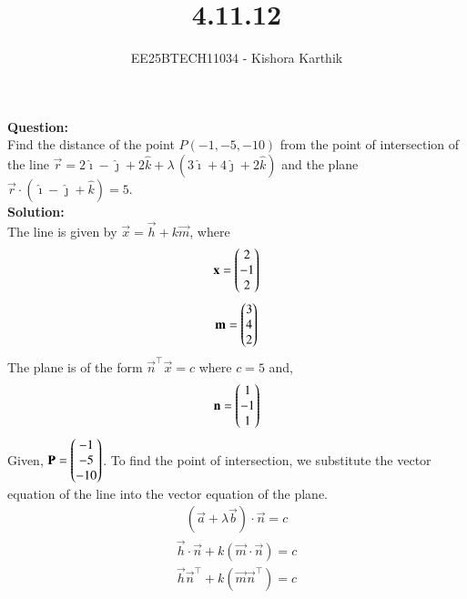 \documentclass[journal]{IEEEtran}
\begin{document}

\vspace{1cm}

\title{4.11.12}
\author{EE25BTECH11034 - Kishora Karthik}
{\let\newpage\relax\maketitle}

\renewcommand{\thefigure}{\theenumi}
\renewcommand{\thetable}{\theenumi}
\textbf{Question:}\\
Find the distance of the point $P(-1,-5,-10)$ from the point of intersection of the line
$\vec{r} = 2\hat{\imath}-\hat{\jmath}+2\hat{k}+\lambda\,(3\hat{\imath}+4\hat{\jmath}+2\hat{k})$
and the plane
$\vec{r}\cdot(\hat{\imath}-\hat{\jmath}+\hat{k})=5$.
\\
\textbf{Solution:}\\
The line is given by $\vec{x}=\vec{h}+k\vec{m}$, where 
\begin{align}
    \mathbf{x}=\begin{pmatrix}2\\-1\\2\end{pmatrix}
\end{align}
\begin{align}
    \mathbf{m}=\begin{pmatrix}3\\4\\2\end{pmatrix}
\end{align}
The plane is of the form $\vec{n}^\top\vec{x}=c$ where $c=5$ and,
\begin{align}
\mathbf{n}=\begin{pmatrix}1\\-1\\1\end{pmatrix}
\end{align}
Given, $\mathbf{P}=\begin{pmatrix}-1\\-5\\-10\end{pmatrix}$.
To find the point of intersection, we substitute the vector equation of the line into the vector equation of the plane.
\begin{align}
(\vec{a} + \lambda\vec{b}) \cdot \vec{n} = c
\end{align}
\begin{align}
\vec{h} \cdot \vec{n} + k(\vec{m} \cdot \vec{n}) = c
\end{align}
\begin{align}
\vec{h}  \vec{n}^\top + k(\vec{m} \vec{n}^\top) = c
\end{align}
\end{document}

